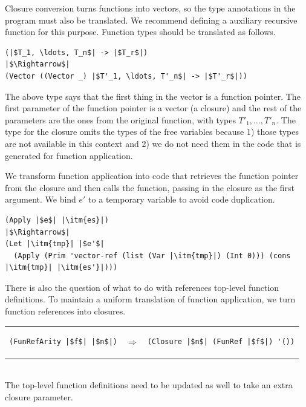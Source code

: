 \documentclass[11pt]{book}
\begin{document}
Closure conversion turns functions into vectors, so the type
annotations in the program must also be translated.  We recommend
defining a auxiliary recursive function for this purpose.  Function
types should be translated as follows.
\begin{lstlisting}
(|$T_1, \ldots, T_n$| -> |$T_r$|)
|$\Rightarrow$|  
(Vector ((Vector _) |$T'_1, \ldots, T'_n$| -> |$T'_r$|))
\end{lstlisting}
The above type says that the first thing in the vector is a function
pointer. The first parameter of the function pointer is a vector (a
closure) and the rest of the parameters are the ones from the original
function, with types $T'_1, \ldots, T'_n$.  The  type for
the closure omits the types of the free variables because 1) those
types are not available in this context and 2) we do not need them in
the code that is generated for function application.

We transform function application into code that retrieves the
function pointer from the closure and then calls the function, passing
in the closure as the first argument. We bind $e'$ to a temporary
variable to avoid code duplication.
\begin{lstlisting}
(Apply |$e$| |\itm{es}|)
|$\Rightarrow$|
(Let |\itm{tmp}| |$e'$|
  (Apply (Prim 'vector-ref (list (Var |\itm{tmp}|) (Int 0))) (cons |\itm{tmp}| |\itm{es'}|)))
\end{lstlisting}

There is also the question of what to do with references top-level
function definitions. To maintain a uniform translation of function
application, we turn function references into closures.

\begin{tabular}{lll}
\begin{minipage}{0.3\textwidth}
\begin{lstlisting}
(FunRefArity |$f$| |$n$|)
\end{lstlisting}
\end{minipage}
&
$\Rightarrow$
&
\begin{minipage}{0.5\textwidth}
\begin{lstlisting}
(Closure |$n$| (FunRef |$f$|) '())
\end{lstlisting}
\end{minipage}
\end{tabular}  \\
%
The top-level function definitions need to be updated as well to take
an extra closure parameter.
\end{document}
